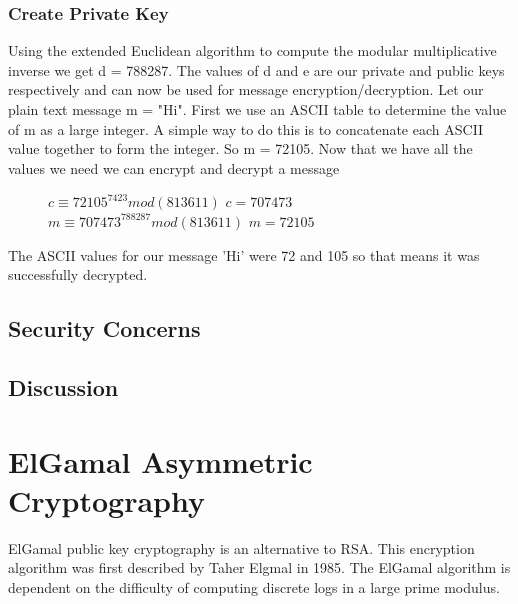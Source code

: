 \documentclass[conference]{IEEEtran}
\begin{document}
\subsubsection{Create Private Key} 
Using the extended Euclidean algorithm to compute the modular multiplicative inverse we get d = 788287. The values of d and e are our private and public keys respectively and can now be used for message encryption/decryption. \newline \indent
Let our plain text message m = "Hi". First we use an ASCII table to determine the value of m as a large integer. A simple way to do this is to concatenate each ASCII value together to form the integer. So m = 72105. Now that we have all the values we need we can encrypt and decrypt a message
\begin{figure}[h]
	\begin{center}
		$c \equiv {72105}^{7423} mod (813611)$ \newline
		$c = 707473$ \newline
		$m \equiv {707473}^{788287} mod (813611)$ \newline
		$m = 72105$ \newline
	\end{center}
\end{figure}

The ASCII values for our message 'Hi' were 72 and 105 so that means it was successfully decrypted. 


\color{red}
\subsection{Security Concerns}

\subsection{Discussion}


\color{black}


\section{ElGamal Asymmetric Cryptography}
ElGamal public key cryptography is an alternative to RSA. This encryption algorithm was first described by Taher Elgmal in 1985. The ElGamal algorithm is dependent on the difficulty of computing discrete logs in a large prime modulus.
\end{document}
